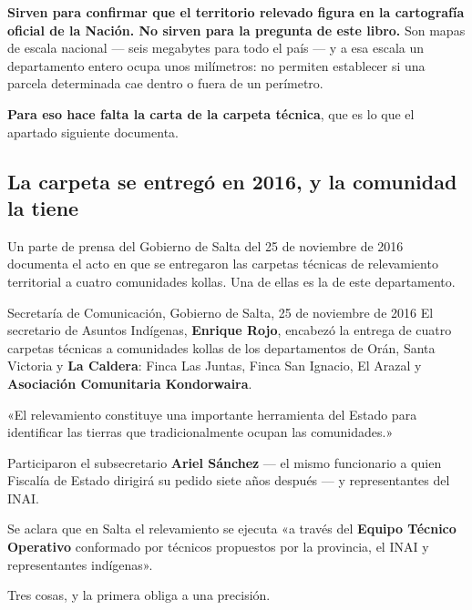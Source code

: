\textbf{Sirven para confirmar que el territorio relevado figura en la cartografía oficial de
la Nación. No sirven para la pregunta de este libro.} Son mapas de escala nacional --- seis
megabytes para todo el país --- y a esa escala un departamento entero ocupa unos milímetros:
no permiten establecer si una parcela determinada cae dentro o fuera de un perímetro.

\textbf{Para eso hace falta la carta de la carpeta técnica}, que es lo que el apartado
siguiente documenta.

\subsection*{La carpeta se entregó en 2016, y la comunidad la tiene}

Un parte de prensa del Gobierno de Salta del 25 de noviembre de 2016 documenta el acto en que
se entregaron las carpetas técnicas de relevamiento territorial a cuatro comunidades kollas.
Una de ellas es la de este departamento.

\begin{ficha}{Secretaría de Comunicación, Gobierno de Salta, 25 de noviembre de 2016}
El secretario de Asuntos Indígenas, \textbf{Enrique Rojo}, encabezó la entrega de cuatro
carpetas técnicas a comunidades kollas de los departamentos de Orán, Santa Victoria y
\textbf{La Caldera}: Finca Las Juntas, Finca San Ignacio, El Arazal y \textbf{Asociación
Comunitaria Kondorwaira}.

«El relevamiento constituye una importante herramienta del Estado para identificar las tierras
que tradicionalmente ocupan las comunidades.»

Participaron el subsecretario \textbf{Ariel Sánchez} --- el mismo funcionario a quien Fiscalía
de Estado dirigirá su pedido siete años después --- y representantes del INAI.

Se aclara que en Salta el relevamiento se ejecuta «a través del \textbf{Equipo Técnico
Operativo} conformado por técnicos propuestos por la provincia, el INAI y representantes
indígenas».
\end{ficha}

Tres cosas, y la primera obliga a una precisión.

